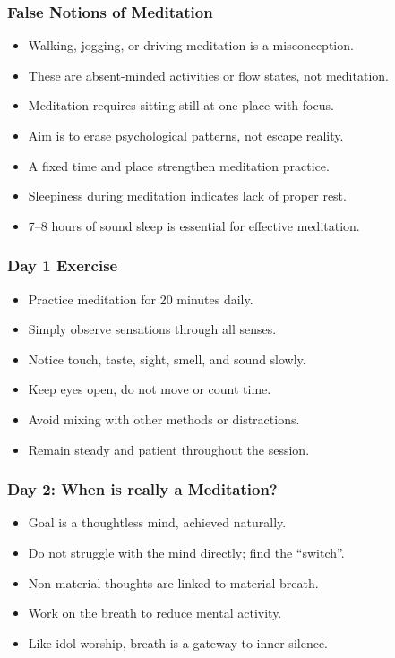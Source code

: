 \begin{frame}[fragile]\frametitle{False Notions of Meditation}
      \begin{itemize}
        \item Walking, jogging, or driving meditation is a misconception.
        \item These are absent-minded activities or flow states, not meditation.
        \item Meditation requires sitting still at one place with focus.
        \item Aim is to erase psychological patterns, not escape reality.
        \item A fixed time and place strengthen meditation practice.
        \item Sleepiness during meditation indicates lack of proper rest.
        \item 7–8 hours of sound sleep is essential for effective meditation.
      \end{itemize}
\end{frame}

\begin{frame}[fragile]\frametitle{Day 1 Exercise}
      \begin{itemize}
        \item Practice meditation for 20 minutes daily.
        \item Simply observe sensations through all senses.
        \item Notice touch, taste, sight, smell, and sound slowly.
        \item Keep eyes open, do not move or count time.
        \item Avoid mixing with other methods or distractions.
        \item Remain steady and patient throughout the session.
      \end{itemize}
\end{frame}

\begin{frame}[fragile]\frametitle{Day 2: When is really a Meditation?}
      \begin{itemize}
        \item Goal is a thoughtless mind, achieved naturally.
        \item Do not struggle with the mind directly; find the “switch”.
        \item Non-material thoughts are linked to material breath.
        \item Work on the breath to reduce mental activity.
        \item Like idol worship, breath is a gateway to inner silence.
      \end{itemize}
\end{frame}

